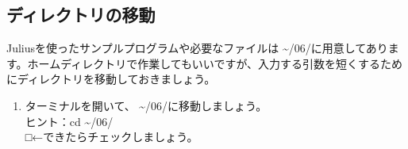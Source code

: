 \subsection{ディレクトリの移動}
Juliusを使ったサンプルプログラムや必要なファイルは \textasciitilde /06/に用意してあります。ホームディレクトリで作業してもいいですが、入力する引数を短くするためにディレクトリを移動しておきましょう。\\

\begin{tcolorbox}[title=\useOmetoi]
\begin{enumerate}
\item ターミナルを開いて、 \textasciitilde /06/に移動しましょう。\\ヒント：cd  \textasciitilde /06/\\□←できたらチェックしましょう。
\end{enumerate}
\end{tcolorbox}
